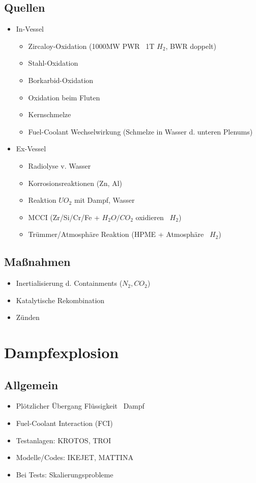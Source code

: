 \documentclass[12pt]{article}
\begin{document}
\subsection{Quellen}
\begin{itemize}[noitemsep]
	\item In-Vessel
		\begin{itemize}[noitemsep]
			\item Zircaloy-Oxidation (1000MW PWR \textrightarrow\ 1T \(H_2\), BWR doppelt)
			\item Stahl-Oxidation
			\item Borkarbid-Oxidation
			\item Oxidation beim Fluten
			\item Kernschmelze
			\item Fuel-Coolant Wechselwirkung (Schmelze in Wasser d. unteren Plenums)
		\end{itemize}
	\item Ex-Vessel
		\begin{itemize}[noitemsep]
			\item Radiolyse v. Wasser
			\item Korrosionsreaktionen (Zn, Al)
			\item Reaktion \(UO_2\) mit Dampf, Wasser
			\item MCCI (Zr/Si/Cr/Fe + \(H_2O/CO_2\) oxidieren \textrightarrow\ \(H_2\))
			\item Trümmer/Atmosphäre Reaktion (HPME + Atmosphäre \textrightarrow\ \(H_2\))
		\end{itemize}
\end{itemize}

\subsection{Maßnahmen}
\begin{itemize}[noitemsep]
	\item Inertialisierung d. Containments (\(N_2, CO_2\))
	\item Katalytische Rekombination
	\item Zünden
\end{itemize}

\section{Dampfexplosion}

\subsection{Allgemein}
\begin{itemize}[noitemsep]
	\item Plötzlicher Übergang Flüssigkeit \textrightarrow\ Dampf
	\item Fuel-Coolant Interaction (FCI)
	\item Testanlagen: KROTOS, TROI
	\item Modelle/Codes: IKEJET, MATTINA
	\item Bei Tests: Skalierungsprobleme
\end{itemize}
\end{document}
